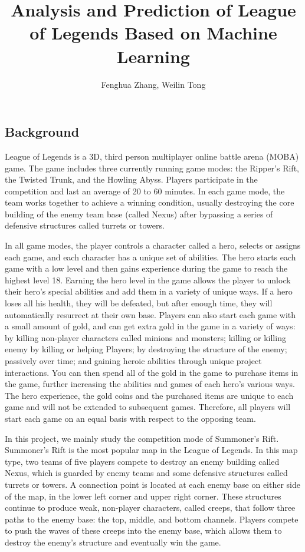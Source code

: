 \documentclass[fleqn,10pt]{wlscirep}
\title{Analysis and Prediction of League of Legends Based on Machine Learning}
\author{ Fenghua Zhang, Weilin Tong}
\begin{document}
\flushbottom
\maketitle

\thispagestyle{empty}


\subsection*{Background}
League of Legends is a 3D, third person multiplayer online battle arena (MOBA) game. The game includes three currently running game modes: the Ripper's Rift, the Twisted Trunk, and the Howling Abyss. Players participate in the competition and last an average of 20 to 60 minutes. In each game mode, the team works together to achieve a winning condition, usually destroying the core building of the enemy team base (called Nexus) after bypassing a series of defensive structures called turrets or towers.

In all game modes, the player controls a character called a hero, selects or assigns each game, and each character has a unique set of abilities. The hero starts each game with a low level and then gains experience during the game to reach the highest level 18. Earning the hero level in the game allows the player to unlock their hero's special abilities and add them in a variety of unique ways. If a hero loses all his health, they will be defeated, but after enough time, they will automatically resurrect at their own base. Players can also start each game with a small amount of gold, and can get extra gold in the game in a variety of ways: by killing non-player characters called minions and monsters; killing or killing enemy by killing or helping Players; by destroying the structure of the enemy; passively over time; and gaining heroic abilities through unique project interactions. You can then spend all of the gold in the game to purchase items in the game, further increasing the abilities and games of each hero's various ways. The hero experience, the gold coins and the purchased items are unique to each game and will not be extended to subsequent games. Therefore, all players will start each game on an equal basis with respect to the opposing team.

In this project, we mainly study the competition mode of Summoner's Rift. Summoner's Rift is the most popular map in the League of Legends. In this map type, two teams of five players compete to destroy an enemy building called Nexus, which is guarded by enemy teams and some defensive structures called turrets or towers. A connection point is located at each enemy base on either side of the map, in the lower left corner and upper right corner. These structures continue to produce weak, non-player characters, called creeps, that follow three paths to the enemy base: the top, middle, and bottom channels. Players compete to push the waves of these creeps into the enemy base, which allows them to destroy the enemy's structure and eventually win the game.
\end{document}
